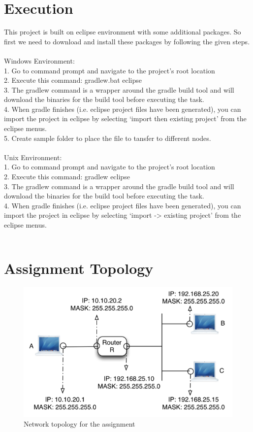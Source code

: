 \documentclass{scrartcl}
\begin{document}
\section{Execution}
This project is built on eclipse environment with some additional packages. So first we need to download and install these packages by following the given steps. \\  \\
Windows Environment: \\
1. Go to command prompt and navigate to the project's root location \\
2. Execute this command: gradlew.bat eclipse \\
3. The gradlew command is a wrapper around the gradle build tool and will download the binaries for the build tool before executing the task. \\
4. When gradle finishes (i.e. eclipse project files have been generated), you can import the project in eclipse by selecting ‘import then existing project’ from the eclipse menus. \\ 
5. Create sample folder to place the file to tansfer to different nodes. \\
\\
Unix Environment: \\
1. Go to command prompt and navigate to the project's root location \\ 
2. Execute this command: {gradlew eclipse} \\
3. The gradlew command is a wrapper around the gradle build tool and will download the binaries for the build tool before executing the task. \\
4. When gradle finishes (i.e. eclipse project files have been generated), you can import the project in eclipse by selecting ‘import -> existing project’ from the eclipse menus. \\ \\

\newpage
\appendix
\section{Assignment Topology} \label{appending:topo-img}
\begin{figure}[H]
\centering
\includegraphics[scale=.65]{topology.png}
\caption{Network topology for the assignment}
\label{fig:topo}
\end{figure}
\newpage
\end{document}
